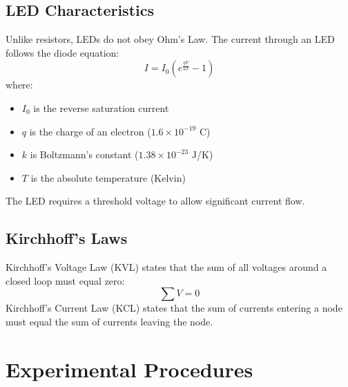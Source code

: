 \documentclass[12pt]{article}
\begin{document}
\subsection{LED Characteristics}
Unlike resistors, LEDs do not obey Ohm’s Law. The current through an LED follows the diode equation:
\[ I = I_0 \left( e^{\frac{qV}{kT}} - 1 \right) \]
where:
\begin{itemize}
	\item \( I_0 \) is the reverse saturation current
	\item \( q \) is the charge of an electron (\(1.6 \times 10^{-19}\) C)
	\item \( k \) is Boltzmann's constant (\(1.38 \times 10^{-23}\) J/K)
	\item \( T \) is the absolute temperature (Kelvin)
\end{itemize}
The LED requires a threshold voltage to allow significant current flow.

\subsection{Kirchhoff’s Laws}
Kirchhoff’s Voltage Law (KVL) states that the sum of all voltages around a closed loop must equal zero:
\[ \sum V = 0 \]
Kirchhoff’s Current Law (KCL) states that the sum of currents entering a node must equal the sum of currents leaving the node.

\section{Experimental Procedures}
\end{document}
